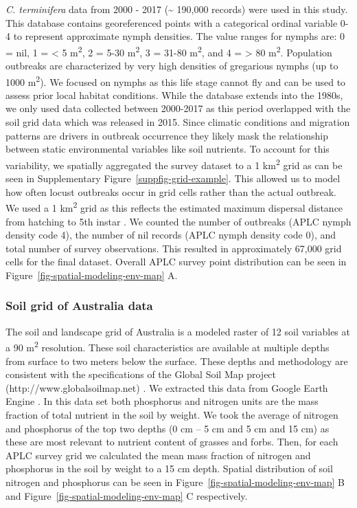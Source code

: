 \documentclass[
]{article}
\begin{document}
\emph{C. terminifera} data from 2000 - 2017 (\textasciitilde{} 190,000
records) were used in this study. This database contains georeferenced
points with a categorical ordinal variable 0-4 to represent approximate
nymph densities. The value ranges for nymphs are: 0 = nil, 1 =
\textless{} 5 m\textsuperscript{2}, 2 = 5-30 m\textsuperscript{2}, 3 =
31-80 m\textsuperscript{2}, and 4 = \textgreater{} 80
m\textsuperscript{2}. Population outbreaks are characterized by very
high densities of gregarious nymphs (up to 1000 m\textsuperscript{2}).
We focused on nymphs as this life stage cannot fly and can be used to
assess prior local habitat conditions. While the database extends into
the 1980s, we only used data collected between 2000-2017 as this period
overlapped with the soil grid data which was released in 2015. Since
climatic conditions and migration patterns are drivers in outbreak
occurrence \citep{lawton_seeing_2022, veran_modeling_2015} they likely
mask the relationship between static environmental variables like soil
nutrients. To account for this variability, we spatially aggregated the
survey dataset to a 1 km\textsuperscript{2} grid as can be seen in
Supplementary Figure~\ref{suppfig-grid-example}. This allowed us to
model how often locust outbreaks occur in grid cells rather than the
actual outbreak. We used a 1 km\textsuperscript{2} grid as this reflects
the estimated maximum dispersal distance from hatching to 5th instar
\citep{hunter_aerial_2008}. We counted the number of outbreaks (APLC
nymph density code 4), the number of nil records (APLC nymph density
code 0), and total number of survey observations. This resulted in
approximately 67,000 grid cells for the final dataset. Overall APLC
survey point distribution can be seen in
Figure~\ref{fig-spatial-modeling-env-map} A.

\subsubsection{Soil grid of Australia
data}\label{soil-grid-of-australia-data}

The soil and landscape grid of Australia is a modeled raster of 12 soil
variables at a 90 m\textsuperscript{2} resolution. These soil
characteristics are available at multiple depths from surface to two
meters below the surface. These depths and methodology are consistent
with the specifications of the Global Soil Map project
(http://www.globalsoilmap.net) \citep{grundy_soil_2015}. We extracted
this data from Google Earth Engine \citep{gorelick_google_2017}. In this
data set both phosphorus and nitrogen units are the mass fraction of
total nutrient in the soil by weight. We took the average of nitrogen
and phosphorus of the top two depths (0 cm -- 5 cm and 5 cm and 15 cm)
as these are most relevant to nutrient content of grasses and forbs.
Then, for each APLC survey grid we calculated the mean mass fraction of
nitrogen and phosphorus in the soil by weight to a 15 cm depth. Spatial
distribution of soil nitrogen and phosphorus can be seen in
Figure~\ref{fig-spatial-modeling-env-map} B and
Figure~\ref{fig-spatial-modeling-env-map} C respectively.
\end{document}
